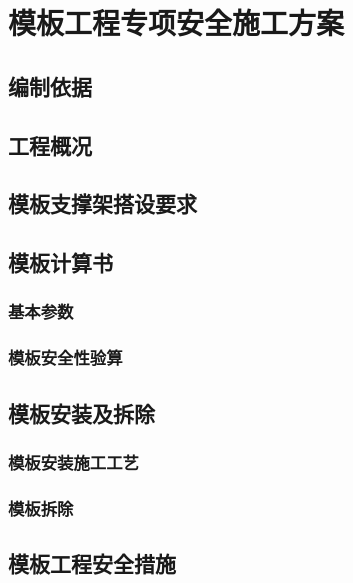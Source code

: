 \section{模板工程专项安全施工方案}
\subsection{编制依据}

\subsection{工程概况}

\subsection{模板支撑架搭设要求}

\subsection{模板计算书}
\subsubsection{基本参数}

\subsubsection{模板安全性验算}

\subsection{模板安装及拆除}
\subsubsection{模板安装施工工艺}

\subsubsection{模板拆除}

\subsection{模板工程安全措施}
